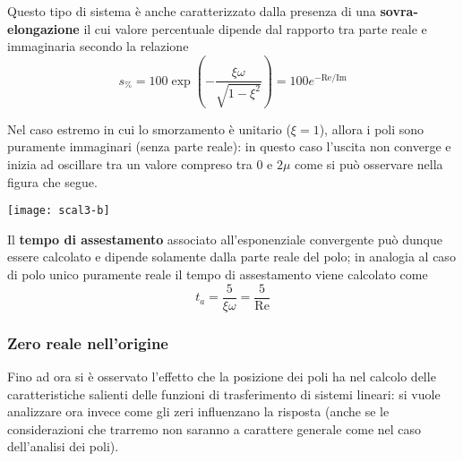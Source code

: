 			Questo tipo di sistema è anche caratterizzato dalla presenza di una \textbf{sovra-elongazione} il cui valore percentuale dipende dal rapporto tra parte reale e immaginaria secondo la relazione
			\begin{equation}
				s_\% = 100 \exp \left(-\frac{\xi \omega}{\sqrt{1-\xi^2}}\right) = 100 e^{-\textrm{Re} / \textrm{Im}}
			\end{equation}
			
			\begin{nota}
				Nel caso estremo in cui lo smorzamento è unitario ($\xi = 1$), allora i poli sono puramente immaginari (senza parte reale): in questo caso l'uscita non converge e inizia ad oscillare tra un valore compreso tra 0 e $2\mu$  come si può osservare nella figura che segue.
				\begin{center}
					\texttt{[image: scal3-b]}
				\end{center}
			\end{nota}
			Il \textbf{tempo di assestamento} associato all'esponenziale convergente può dunque essere calcolato e dipende solamente dalla parte reale del polo; in analogia al caso di polo unico puramente reale il tempo di assestamento viene calcolato come
			\begin{equation}
				t_a = \frac 5 {\xi \omega} = \frac 5 {\textrm{Re}}
			\end{equation}
			
		\subsubsection{Zero reale nell'origine}
			Fino ad ora si è osservato l'effetto che la posizione dei poli ha nel calcolo delle caratteristiche salienti delle funzioni di trasferimento di sistemi lineari: si vuole analizzare ora invece come gli zeri influenzano la risposta (anche se le considerazioni che trarremo non saranno a carattere generale come nel caso dell'analisi dei poli).
			
